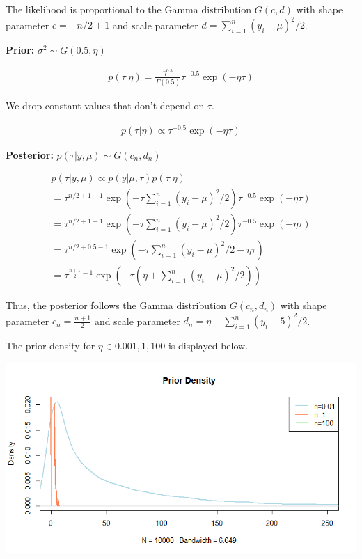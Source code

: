 \documentclass{article}
\begin{document}
The likelihood is proportional to the Gamma distribution $G(c,d)$ with shape parameter $c=-n/2+1$ and scale parameter $d=\sum_{i=1}^{n}(y_{i}-\mu)^{2}/2$.

\textbf{Prior:} $\sigma^{2} \sim G(0.5,\eta)$

\begin{align*}
    p(\tau|\eta)=\frac{\eta^{0.5}}{\Gamma(0.5)}\tau^{-0.5}\exp(-\eta\tau)
\end{align*}

We drop constant values that don't depend on $\tau$.

\begin{align*}
    p(\tau|\eta)\propto\tau^{-0.5}\exp(-\eta\tau)
\end{align*}

\textbf{Posterior:} $p(\tau|y,\mu)\sim G(c_{n},d_{n})$

\begin{align*}
    p(\tau|y,\mu) \propto p(y|\mu,\tau)p(\tau|\eta) \\
    =\tau^{n/2+1-1}\exp(-\tau\sum_{i=1}^{n}(y_{i}-\mu)^{2}/2)\tau^{-0.5}\exp(-\eta\tau) \\
    =\tau^{n/2+1-1}\exp(-\tau\sum_{i=1}^{n}(y_{i}-\mu)^{2}/2)\tau^{-0.5}\exp(-\eta\tau) \\
    = \tau^{n/2+0.5-1}\exp(-\tau\sum_{i=1}^{n}(y_{i}-\mu)^2/2-\eta\tau) \\
    = \tau^{\frac{n+1}{2}-1}\exp(-\tau(\eta+\sum_{i=1}^{n}(y_{i}-\mu)^2/2))
\end{align*}

Thus, the posterior follows the Gamma distribution $G(c_{n},d_{n})$ with shape parameter $c_{n}=\frac{n+1}{2}$ and scale parameter $d_{n}=\eta+\sum_{i=1}^{n}(y_{i}-5)^2/2$.

The prior density for $\eta \in {0.001,1,100}$ is displayed below.

\includegraphics{Figures and Plots/figure-latex/Rplot 42.png}
\end{document}
